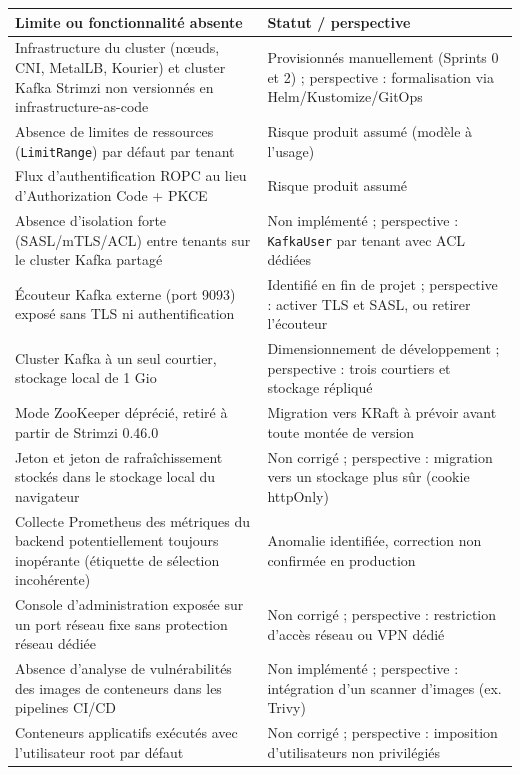 \begin{table}[H]
\centering
\renewcommand{\arraystretch}{1.3}
\begin{tabular}{|p{6.5cm}|p{7.5cm}|}
\hline
Limite ou fonctionnalité absente & Statut / perspective \\
\hline
Infrastructure du cluster (nœuds, CNI, MetalLB, Kourier) et cluster Kafka Strimzi non versionnés en infrastructure-as-code & Provisionnés manuellement (Sprints 0 et 2) ; perspective : formalisation via Helm/Kustomize/GitOps \\
\hline
Absence de limites de ressources (\texttt{LimitRange}) par défaut par tenant & Risque produit assumé (modèle à l'usage) \\
\hline
Flux d'authentification ROPC au lieu d'Authorization Code + PKCE & Risque produit assumé \\
\hline
Absence d'isolation forte (SASL/mTLS/ACL) entre tenants sur le cluster Kafka partagé & Non implémenté ; perspective : \texttt{KafkaUser} par tenant avec ACL dédiées \\
\hline
Écouteur Kafka externe (port 9093) exposé sans TLS ni authentification & Identifié en fin de projet ; perspective : activer TLS et SASL, ou retirer l'écouteur \\
\hline
Cluster Kafka à un seul courtier, stockage local de 1 Gio & Dimensionnement de développement ; perspective : trois courtiers et stockage répliqué \\
\hline
Mode ZooKeeper déprécié, retiré à partir de Strimzi 0.46.0 & Migration vers KRaft à prévoir avant toute montée de version \\
\hline
Jeton et jeton de rafraîchissement stockés dans le stockage local du navigateur & Non corrigé ; perspective : migration vers un stockage plus sûr (cookie httpOnly) \\
\hline
Collecte Prometheus des métriques du backend potentiellement toujours inopérante (étiquette de sélection incohérente) & Anomalie identifiée, correction non confirmée en production \\
\hline
Console d'administration exposée sur un port réseau fixe sans protection réseau dédiée & Non corrigé ; perspective : restriction d'accès réseau ou VPN dédié \\
\hline
Absence d'analyse de vulnérabilités des images de conteneurs dans les pipelines CI/CD & Non implémenté ; perspective : intégration d'un scanner d'images (ex. Trivy) \\
\hline
Conteneurs applicatifs exécutés avec l'utilisateur root par défaut & Non corrigé ; perspective : imposition d'utilisateurs non privilégiés \\

\end{tabular}
\end{table}

